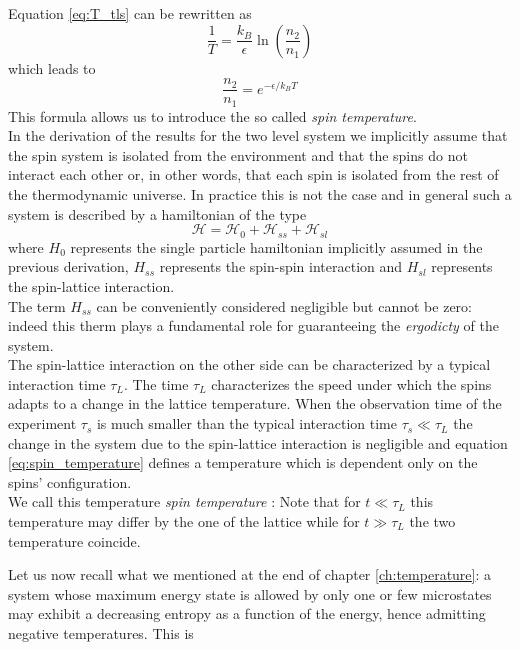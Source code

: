 Equation \ref{eq:T_tls} can be rewritten as
\begin{equation*}
    \frac{1}{T} = \frac{k_B}{\epsilon} \ln\left(\frac{n_2}{n_1}\right)
\end{equation*}
which leads to 
\begin{equation}
    \frac{n_2}{n_1} = e^{-\epsilon/k_BT}
    \label{eq:spin_temperature}
\end{equation}
This formula allows us to introduce the so called \emph{spin temperature}. \\
In the derivation of the results for the two level system we implicitly assume that the spin system is
isolated from the environment and that the spins do not interact each other or, in other words, that each spin is isolated from the rest of the thermodynamic universe.
In practice this is not the case and in general such a system is described by a hamiltonian of the type
\begin{equation}
    \mathcal{H} = \mathcal{H}_0 + \mathcal{H}_{ss} + \mathcal{H}_{sl}
    \label{eq:Hamiltonian_lattice_spin}
\end{equation}
where $H_0$ represents the single particle hamiltonian implicitly assumed in the previous derivation, $H_{ss}$ represents the spin-spin interaction and $H_{sl}$ represents the spin-lattice interaction. \\
The term $H_{ss}$ can be conveniently considered negligible but cannot be zero: indeed this therm plays a fundamental role for guaranteeing the \emph{ergodicty} of the system. \\
The spin-lattice interaction on the other side can be characterized by a typical interaction time $\tau_L$. The time $\tau_L$ characterizes the speed under which the spins adapts to a change in the lattice temperature. 
When the observation time of the experiment $\tau_s$ is much smaller than the typical interaction time $\tau_s \ll \tau_L$ the change in the system due to the spin-lattice interaction is negligible and equation \ref{eq:spin_temperature} defines a temperature which is dependent only on the spins' configuration. \\
We call this temperature \emph{spin temperature} \cite{Spin_temperature}: Note that for $t\ll \tau_L$ this temperature may differ by the one of the lattice while for $t \gg \tau_L$ the two temperature coincide. \par
\vspace{10pt}
Let us now recall what we mentioned at the end of chapter \ref{ch:temperature}: a system whose maximum energy state is allowed by only one or few microstates may exhibit a decreasing entropy as a function of the energy, hence admitting negative temperatures. This is 
